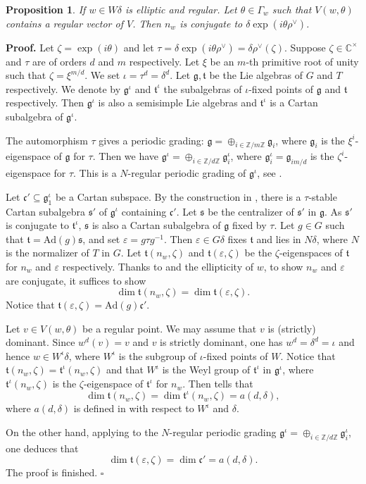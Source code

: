 \documentclass[12pt,leqno]{article}
\newtheorem{proposition}[equation]{Proposition}
\newcommand{\qed}{\hfill $\square$ \medskip}
\newenvironment{proof}[1][Proof]{\noindent\textbf{#1.} }{\qed}
\newcommand{\Ad}{\text{Ad}}
\newcommand{\G}{G}
\renewcommand{\t}{\mathfrak t}
\def\fg{\mathfrak g}
\def\fc{\mathfrak c}
\def\ft{\mathfrak t}
\def\fs{\mathfrak s}
\def\G{\Gamma}
\def\d{\delta}
\def\t{\tau}
\def\z{\zeta}
\def\i{^{-1}}
\begin{document}
\begin{proposition}\label{regular} If $w \in W\d$ is elliptic and
regular. Let $\theta \in \G_w$ such that $V(w, \theta)$ contains a
regular vector of $V$. Then $n_w$ is conjugate to $\d \exp(i \theta
\rho^\vee)$.
\end{proposition}
\begin{proof} Let $\zeta=\exp(i \theta)$ and let $\t=\d \exp(i \theta
\rho^\vee)=\d \rho^\vee(\zeta)$. Suppose $\zeta \in \mathbb C^\times$
and $\t$ are of orders $d$ and $m$ respectively. Let $\xi$ be an
$m$-th primitive root of unity such that $\zeta=\xi^{m/d}$. We set
$\iota=\tau^d=\delta^d$. Let $\fg, \ft$ be the Lie algebras of $G$ and
$T$ respectively. We denote by $\fg^\iota$ and $\ft^\iota$ the
subalgebras of $\iota$-fixed points of $\fg$ and $\ft$
respectively. Then $\fg^\iota$ is also a semisimple Lie algebras and
$\ft^\iota$ is a Cartan subalgebra of $\fg^\iota$.
	
	The automorphism $\t$ gives a periodic grading: $\fg=\oplus_{i
\in \mathbb Z/m\mathbb Z} \fg_i$, where $\fg_i$ is the
$\xi^i$-eigenspace of $\fg$ for $\t$. Then we have $\fg^\iota =
\oplus_{i \in \mathbb Z / d\mathbb Z} \fg^\iota_i$, where
$\fg^\iota_i=\fg_{im/d}$ is the $\zeta^i$-eigenspace for $\t$. This is
a $N$-regular periodic grading of ${\fg}^{\iota}$, see \cite[Section
3]{panyushev}.
	
	Let $\fc' \subseteq \fg^\iota_1$ be a Cartan subspace. By the
construction in \cite[Subsection 3.1]{rgly}, there is a $\t$-stable
Cartan subalgebra $\fs'$ of $\fg^\iota$ containing $\fc'$. Let $\fs$
be the centralizer of $\fs'$ in $\fg$. As $\fs'$ is conjugate to
$\ft^\iota$, $\fs$ is also a Cartan subalgebra of $\fg$ fixed by
$\t$. Let $g \in G$ such that $\ft=\Ad(g) \fs$, and set $\varepsilon=g
\t g\i$. Then $\varepsilon \in G \d$ fixes $\ft$ and lies in $N \d$,
where $N$ is the normalizer of $T$ in $G$. Let $\ft(n_w, \z)$ and
$\ft(\varepsilon, \z)$ be the $\z$-eigenspaces of $\ft$ for $n_w$ and
$\varepsilon$ respectively. Thanks to \cite[Theorem 6.4 (iv)]{springer_regular} and
the ellipticity of $w$, to show $n_w$ and $\varepsilon$ are conjugate,
it suffices to show $$\dim \ft(n_w, \z)= \dim \ft(\varepsilon, \z).$$
Notice that $\ft(\varepsilon, \z)=\Ad(g) \fc'$.
	
	Let $v \in V(w, \theta)$ be a regular point. We may assume
that $v$ is (strictly) dominant. Since $w^d(v)=v$ and $v$ is strictly
dominant, one has $w^d=\d^d=\iota$ and hence $w \in W^\iota \d$, where
$W^\iota$ is the subgroup of $\iota$-fixed points of $W$. Notice that
$\ft(n_w, \z)=\ft^\iota(n_w, \z)$ and that $W^\iota$ is the Weyl group
of $\ft^\iota$ in $\fg^\iota$, where $\ft^\iota(n_w, \z)$ is the
$\z$-eigenspace of $\ft^\iota$ for $n_w$. Then \cite[Theorem 6.4
(ii)]{springer_regular} tells that $$\dim \ft(n_w, \z) = \dim \ft^\iota(n_w, \z)=
a(d, \d),$$ where $a(d, \d)$ is defined in \cite[Section 6]{springer_regular} with
respect to $W^\iota$ and $\d$.
	
	On the other hand, applying \cite[Theorem 3.3 (v)]{panyushev} to the
$N$-regular periodic grading $\fg^\iota = \oplus_{i \in \mathbb Z /
d\mathbb Z} \fg^\iota_i$, one deduces that $$\dim \ft(\varepsilon, \z)
= \dim \fc' = a(d, \d).$$ The proof is finished.
\end{proof}
\end{document}
